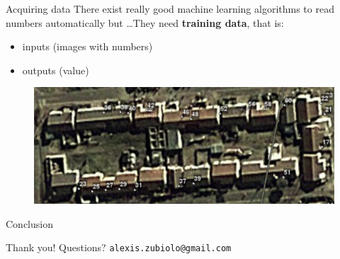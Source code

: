 \documentclass{beamer}
\begin{document}
\begin{frame}{Acquiring data}
There exist really good machine learning algorithms to read numbers automatically but \ldots \pause They need \textbf{training data}, that is:
\begin{itemize}
	\item inputs (images with numbers)
	\item outputs (value)
\end{itemize}
\vfill
\pause
\begin{figure}
\centering
\includegraphics[width=\textwidth]{images/house_numbers.png}
\end{figure}
\end{frame}

\begin{frame}{Conclusion}

\end{frame}

\begin{frame}
\vfill
\centering
\begin{huge}
\huge{Thank you! Questions?}
\vfill
\texttt{alexis.zubiolo@gmail.com}
\end{huge}
\vfill
\end{frame}
\end{document}
